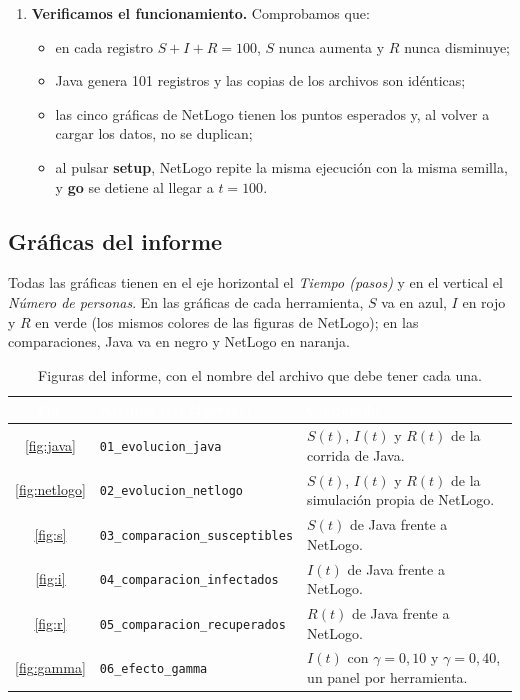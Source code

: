 \documentclass[11pt,a4paper]{article}
\renewcommand{\arraystretch}{1.08}
\newcommand{\cab}[1]{\textbf{\textcolor{white}{#1}}}
\newcommand{\tabestilo}{\arrayrulecolor{borderblue}\setlength{\arrayrulewidth}{0.75pt}\renewcommand{\arraystretch}{1.2}}
\begin{document}
\begin{enumerate}
  \item \textbf{Verificamos el funcionamiento.} Comprobamos que:
  \begin{itemize}
    \item en cada registro $S+I+R=100$, $S$ nunca aumenta y $R$ nunca disminuye;
    \item Java genera 101 registros y las copias de los archivos son idénticas;
    \item las cinco gráficas de NetLogo tienen los puntos esperados y, al volver a cargar los datos, no se duplican;
    \item al pulsar \textbf{setup}, NetLogo repite la misma ejecución con la misma semilla, y \textbf{go} se detiene al llegar a $t=100$.
  \end{itemize}
\end{enumerate}

\subsection{Gráficas del informe}
Todas las gráficas tienen en el eje horizontal el \textit{Tiempo (pasos)} y en el vertical el \textit{Número de personas}. En las gráficas de cada herramienta, $S$ va en azul, $I$ en rojo y $R$ en verde (los mismos colores de las figuras de NetLogo); en las comparaciones, Java va en negro y NetLogo en naranja.

\begin{table}[H]
\centering\tabestilo\footnotesize
\begin{tabularx}{\textwidth}{|c|L{0.36\textwidth}|Y|}
\hline{}\cab{Fig.} & \cab{Archivo (en \texttt{figures/})} & \cab{Contenido} \\ \hline
\ref{fig:java} & \texttt{01\_evolucion\_java} & $S(t)$, $I(t)$ y $R(t)$ de la corrida de Java. \\ \hline
{}\ref{fig:netlogo} & \texttt{02\_evolucion\_netlogo} & $S(t)$, $I(t)$ y $R(t)$ de la simulación propia de NetLogo. \\ \hline
\ref{fig:s} & \texttt{03\_comparacion\_susceptibles} & $S(t)$ de Java frente a NetLogo. \\ \hline
{}\ref{fig:i} & \texttt{04\_comparacion\_infectados} & $I(t)$ de Java frente a NetLogo. \\ \hline
\ref{fig:r} & \texttt{05\_comparacion\_recuperados} & $R(t)$ de Java frente a NetLogo. \\ \hline
{}\ref{fig:gamma} & \texttt{06\_efecto\_gamma} & $I(t)$ con $\gamma=0{,}10$ y $\gamma=0{,}40$, un panel por herramienta. \\ \hline
\end{tabularx}
\caption{Figuras del informe, con el nombre del archivo que debe tener cada una.}
\label{tab:figuras}
\end{table}
\end{document}
